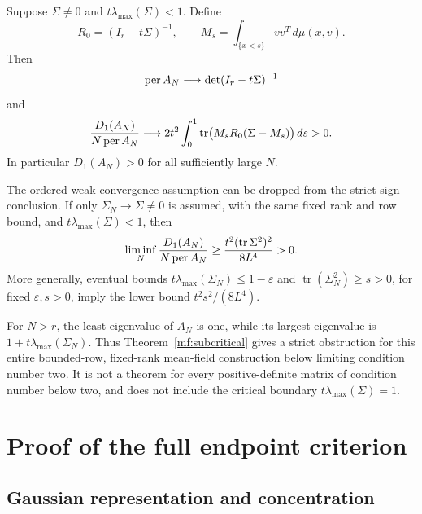 \begin{theorem}\label{mf:subcritical}
Suppose \(\Sigma\ne0\) and \(t\lambda_{\max}(\Sigma)<1\).
Define
\[
 R_0=(I_r-t\Sigma)^{-1},\qquad
 M_s=\int_{\{x<s\}}vv^T\,d\mu(x,v).
\]
Then
\begin{equation}\label{mf:permanent-limit}
 \operatorname{per} A_N\longrightarrow\det(I_r-t\Sigma)^{-1}
\end{equation}
and
\begin{equation}\label{mf:subcritical-limit}
 \frac{D_1(A_N)}{N\operatorname{per} A_N}\longrightarrow
 2t^2\int_0^1\operatorname{tr}
       \bigl(M_sR_0(\Sigma-M_s)\bigr)\,ds>0.
\end{equation}
In particular \(D_1(A_N)>0\) for all sufficiently large \(N\).
\end{theorem}

\begin{corollary}\label{mf:arbitrary-orders}
The ordered weak-convergence assumption can be dropped from the strict
sign conclusion. If only \(\Sigma_N\to\Sigma\ne0\) is assumed, with the
same fixed rank and row bound, and \(t\lambda_{\max}(\Sigma)<1\), then
\begin{equation}\label{mf:uniform-positive}
 \liminf_N\frac{D_1(A_N)}{N\operatorname{per} A_N}
 \ge\frac{t^2(\operatorname{tr}\Sigma^2)^2}{8L^4}>0.
\end{equation}
More generally, eventual bounds
\(t\lambda_{\max}(\Sigma_N)\le1-\varepsilon\) and
\(\operatorname{tr}(\Sigma_N^2)\ge s>0\), for fixed
\(\varepsilon,s>0\), imply the lower bound \(t^2s^2/(8L^4)\).
\end{corollary}

For \(N>r\), the least eigenvalue of \(A_N\) is one, while its largest
eigenvalue is \(1+t\lambda_{\max}(\Sigma_N)\).
Thus Theorem~\ref{mf:subcritical} gives a strict obstruction for this
entire bounded-row, fixed-rank mean-field construction below limiting
condition number two. It is not a theorem for every positive-definite
matrix of condition number below two, and does not include the critical
boundary \(t\lambda_{\max}(\Sigma)=1\).

\section{Proof of the full endpoint criterion}\label{mf:criterion-proof}

\subsection{Gaussian representation and concentration}

